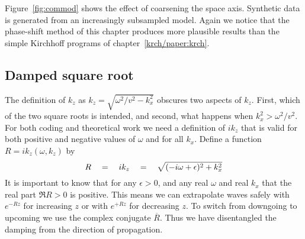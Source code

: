 Figure~\ref{fig:commod} shows the effect of coarsening the space axis.
Synthetic data is generated from an increasingly subsampled model.
Again we notice that the phase-shift method of this chapter
produces more plausible results than
the simple Kirchhoff programs of chapter~\ref{krch/paper:krch}.



\subsection{Damped square root}
The definition of $k_z$ as $k_z=\sqrt{\omega^2/v^2 - k_x^2}$
obscures two aspects of $k_z$.
First, which of the two square roots is intended,
and second, what happens when $k_x^2 > \omega^2/v^2$.
For both coding and theoretical work we
need a definition of $ik_z$ that is valid
for both positive and negative values of $\omega$
and for all $k_x$.
Define a function $R=ik_z(\omega,k_z)$ by
\begin{equation}
        R \quad =\quad ik_z \quad =\quad
        \sqrt{(-i \omega + \epsilon)^2+k_x^2}
\end{equation}
It is important to know that for any $\epsilon >0$,
and any real $\omega$ and  real $k_x$ that
the real part $\Re R>0$ is positive.
This means we can extrapolate waves safely
with $e^{-Rz}$ for increasing $z$ or
with $e^{+Rz}$ for decreasing $z$.
To switch from downgoing to upcoming we use
the complex conjugate $\overline{R}$.
Thus we have disentangled the damping from the direction of propagation.

